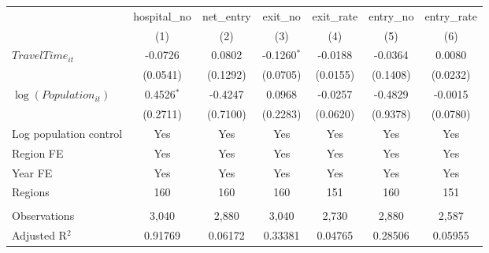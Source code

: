 \begingroup
\centering
\begin{tabular}{lcccccc}
   \toprule
                            & hospital\_no  & net\_entry  & exit\_no      & exit\_rate  & entry\_no  & entry\_rate \\    
                            & (1)           & (2)         & (3)           & (4)         & (5)        & (6)\\  
   \midrule 
   $TravelTime_{it}$        & -0.0726       & 0.0802      & -0.1260$^{*}$ & -0.0188     & -0.0364    & 0.0080\\   
                            & (0.0541)      & (0.1292)    & (0.0705)      & (0.0155)    & (0.1408)   & (0.0232)\\   
   $\log(Population_{it})$  & 0.4526$^{*}$  & -0.4247     & 0.0968        & -0.0257     & -0.4829    & -0.0015\\   
                            & (0.2711)      & (0.7100)    & (0.2283)      & (0.0620)    & (0.9378)   & (0.0780)\\   
   Log population control   & Yes           & Yes         & Yes           & Yes         & Yes        & Yes\\  
   Region FE                & Yes           & Yes         & Yes           & Yes         & Yes        & Yes\\  
   Year FE                  & Yes           & Yes         & Yes           & Yes         & Yes        & Yes\\  
   Regions                  & 160           & 160         & 160           & 151         & 160        & 151\\  
    \\
   Observations             & 3,040         & 2,880       & 3,040         & 2,730       & 2,880      & 2,587\\  
   Adjusted R$^2$           & 0.91769       & 0.06172     & 0.33381       & 0.04765     & 0.28506    & 0.05955\\  
   \bottomrule
\end{tabular}
\par\endgroup
